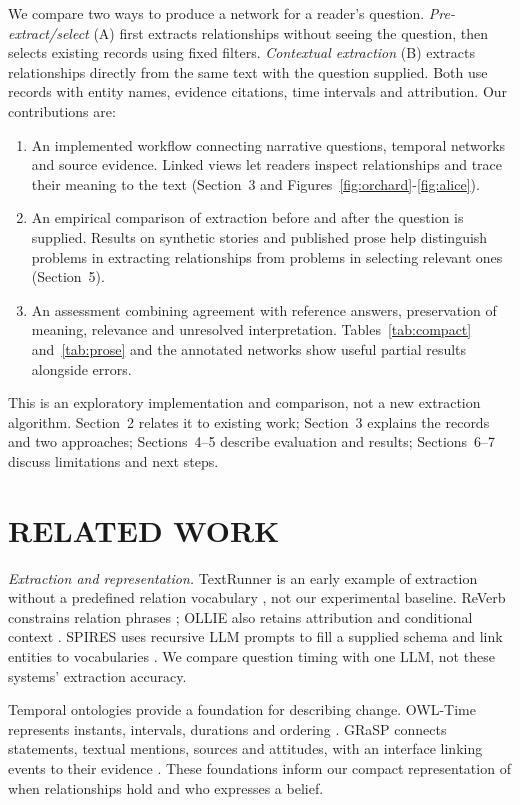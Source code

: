\documentclass[a4paper,twoside]{article}
\begin{document}
We compare two ways to produce a network for a reader's question. \emph{Pre-extract/select} (A) first extracts relationships without seeing the question, then selects existing records using fixed filters. \emph{Contextual extraction} (B) extracts relationships directly from the same text with the question supplied. Both use records with entity names, evidence citations, time intervals and attribution. Our contributions are:

\begin{enumerate}
\item An implemented workflow connecting narrative questions, temporal networks and source evidence. Linked views let readers inspect relationships and trace their meaning to the text (Section~3 and Figures~\ref{fig:orchard}-\ref{fig:alice}).
\item An empirical comparison of extraction before and after the question is supplied. Results on synthetic stories and published prose help distinguish problems in extracting relationships from problems in selecting relevant ones (Section~5).
\item An assessment combining agreement with reference answers, preservation of meaning, relevance and unresolved interpretation. Tables~\ref{tab:compact} and~\ref{tab:prose} and the annotated networks show useful partial results alongside errors.
\end{enumerate}

This is an exploratory implementation and comparison, not a new extraction algorithm. Section~2 relates it to existing work; Section~3 explains the records and two approaches; Sections~4--5 describe evaluation and results; Sections~6--7 discuss limitations and next steps.

\OrchardFigure
\section{\uppercase{Related Work}}
\noindent \emph{Extraction and representation.} TextRunner is an early example of extraction without a predefined relation vocabulary \cite{banko2007}, not our experimental baseline. ReVerb constrains relation phrases \cite{fader2011}; OLLIE also retains attribution and conditional context \cite{mausam2012}. SPIRES uses recursive LLM prompts to fill a supplied schema and link entities to vocabularies \cite{caufield2024}. We compare question timing with one LLM, not these systems' extraction accuracy.

Temporal ontologies provide a foundation for describing change. OWL-Time represents instants, intervals, durations and ordering \cite{time2017}. GRaSP connects statements, textual mentions, sources and attitudes, with an interface linking events to their evidence \cite{fokkens2017}. These foundations inform our compact representation of when relationships hold and who expresses a belief.
\end{document}

